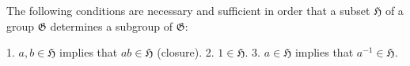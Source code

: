 The following conditions are necessary and sufficient in order that a subset $\mathfrak{H}$ of a group $\mathfrak{G}$ determines a subgroup of $\mathfrak{G}$:

1. $a, b \in \mathfrak{H}$ implies that $ab \in \mathfrak{H}$ (closure).
2. $1 \in \mathfrak{H}$.
3. $a \in \mathfrak{H}$ implies that $a^{-1} \in \mathfrak{H}$.
